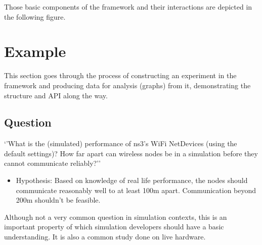 \documentclass[letterpaper,10pt,english]{sphinxmanual}
\begin{document}
Those basic components of the framework and their interactions are depicted in the following figure.

\noindent{}


\section{Example}
\label{\detokenize{statistics:example}}
This section goes through the process of constructing an experiment in the framework and producing data for analysis (graphs) from it, demonstrating the structure and API along the way.


\subsection{Question}
\label{\detokenize{statistics:question}}
‘’What is the (simulated) performance of ns\sphinxhyphen{}3’s WiFi NetDevices (using the default settings)?  How far apart can wireless nodes be in a simulation before they cannot communicate reliably?’’
\begin{itemize}
\item {} 
Hypothesis: Based on knowledge of real life performance, the nodes should communicate reasonably well to at least 100m apart.  Communication beyond 200m shouldn’t be feasible.

\end{itemize}

Although not a very common question in simulation contexts, this is an important property of which simulation developers should have a basic understanding.  It is also a common study done on live hardware.
\end{document}
